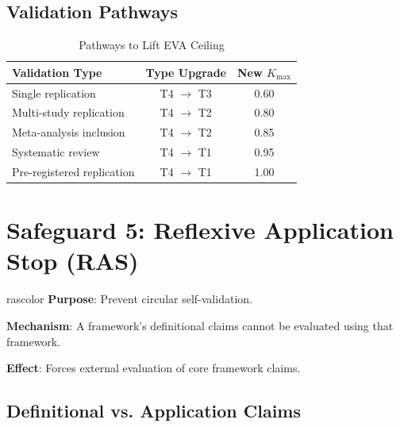 \documentclass[11pt,a4paper]{article}
\theoremstyle{remark}
\begin{document}
\subsection{Validation Pathways}

\begin{table}[h]
\centering
\caption{Pathways to Lift EVA Ceiling}
\label{tab:eva-pathways}
\begin{tabular}{lcc}
\toprule
\textbf{Validation Type} & \textbf{Type Upgrade} & \textbf{New $K_{\max}$} \\
\midrule
Single replication & T4 $\to$ T3 & 0.60 \\
Multi-study replication & T4 $\to$ T2 & 0.80 \\
Meta-analysis inclusion & T4 $\to$ T2 & 0.85 \\
Systematic review & T4 $\to$ T1 & 0.95 \\
Pre-registered replication & T4 $\to$ T1 & 1.00 \\
\bottomrule
\end{tabular}
\end{table}


\section{Safeguard 5: Reflexive Application Stop (RAS)}
\label{sec:ras}

\begin{safeguardbox}{rascolor}
\textbf{Purpose}: Prevent circular self-validation.

\textbf{Mechanism}: A framework's definitional claims cannot be evaluated using that framework.

\textbf{Effect}: Forces external evaluation of core framework claims.
\end{safeguardbox}

\subsection{Definitional vs. Application Claims}
\end{document}
